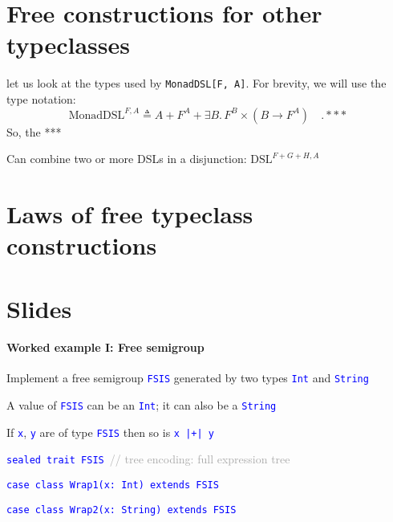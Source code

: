\section{Free constructions for other typeclasses}

let us look at the types used by \lstinline!MonadDSL[F, A]!.
For brevity, we will use the type notation:
\[
\text{MonadDSL}^{F,A}\triangleq A+F^{A}+\exists B.\,F^{B}\times(B\rightarrow F^{A})\quad.***
\]
 So, the {*}{*}{*}

Can combine two or more DSLs in a disjunction: $\text{DSL}^{F+G+H,A}$

\section{Laws of free typeclass constructions}

\section{Slides}

\paragraph{Worked example I: Free semigroup}

Implement a free semigroup \texttt{\textcolor{blue}{\footnotesize{}FSIS}}
generated by two types \texttt{\textcolor{blue}{\footnotesize{}Int}}
and \texttt{\textcolor{blue}{\footnotesize{}String}} 

A value of \texttt{\textcolor{blue}{\footnotesize{}FSIS}} can be an
\texttt{\textcolor{blue}{\footnotesize{}Int}}; it can also be a \texttt{\textcolor{blue}{\footnotesize{}String}} 

If \texttt{\textcolor{blue}{\footnotesize{}x}}, \texttt{\textcolor{blue}{\footnotesize{}y}}
are of type \texttt{\textcolor{blue}{\footnotesize{}FSIS}} then so
is \texttt{\textcolor{blue}{\footnotesize{}x |+| y}} 

\texttt{\textcolor{blue}{\footnotesize{}sealed trait FSIS }}\textcolor{darkgray}{\footnotesize{}//
tree encoding: full expression tree}{\footnotesize\par}

\texttt{\textcolor{blue}{\footnotesize{}case class Wrap1(x: Int) extends
FSIS}}{\footnotesize\par}

\texttt{\textcolor{blue}{\footnotesize{}case class Wrap2(x: String)
extends FSIS}}{\footnotesize\par}

